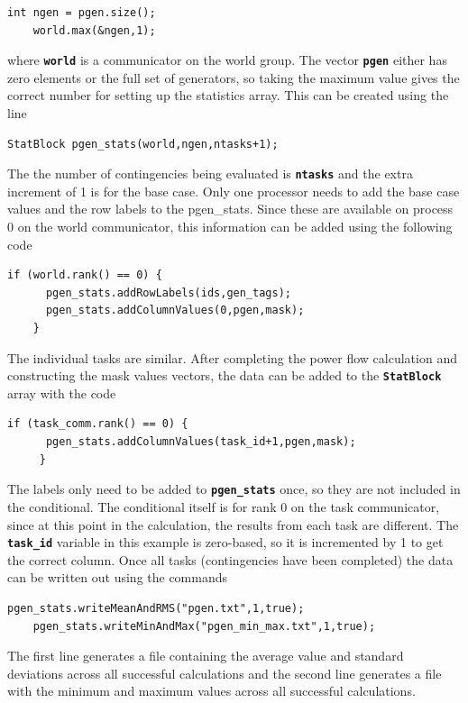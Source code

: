 {
\color{red}
\begin{Verbatim}[fontseries=b]
    int ngen = pgen.size();
    world.max(&ngen,1);
\end{Verbatim}
}

where \texttt{\textbf{world}} is a communicator on the world group. The vector \texttt{\textbf{pgen}} either has zero elements or the full set of generators, so taking the maximum value gives the correct number for setting up the statistics array. This can be created using the line

{
\color{red}
\begin{Verbatim}[fontseries=b]
    StatBlock pgen_stats(world,ngen,ntasks+1);
\end{Verbatim}
}

The the number of contingencies being evaluated is \texttt{\textbf{ntasks}} and the extra increment of 1 is for the base case. Only one processor needs to add the base case values and the row labels to the pgen\_stats. Since these are available on process 0 on the world communicator, this information can be added using the following code

{
\color{red}
\begin{Verbatim}[fontseries=b]
    if (world.rank() == 0) {
      pgen_stats.addRowLabels(ids,gen_tags);
      pgen_stats.addColumnValues(0,pgen,mask);
    }
\end{Verbatim}
}

The individual tasks are similar. After completing the power flow calculation and constructing the mask values vectors, the data can be added to the \texttt{\textbf{StatBlock}} array with the code

{
\color{red}
\begin{Verbatim}[fontseries=b]
     if (task_comm.rank() == 0) {
      pgen_stats.addColumnValues(task_id+1,pgen,mask);
     }
\end{Verbatim}
}

The labels only need to be added to \texttt{\textbf{pgen\_stats}} once, so they are not included in the conditional. The conditional itself is for rank 0 on the task communicator, since at this point in the calculation, the results from each task are different. The \texttt{\textbf{task\_id}} variable in this example is zero-based, so it is incremented by 1 to get the correct column.
Once all tasks (contingencies have been completed) the data can be written out using the commands

{
\color{red}
\begin{Verbatim}[fontseries=b]
    pgen_stats.writeMeanAndRMS("pgen.txt",1,true);
    pgen_stats.writeMinAndMax("pgen_min_max.txt",1,true);
\end{Verbatim}
}

The first line generates a file containing the average value and standard deviations across all successful calculations and the second line generates a file with the minimum and maximum values across all successful calculations.
\newline
\hyperlink{topDoc}{\color{blue}{Top}}
